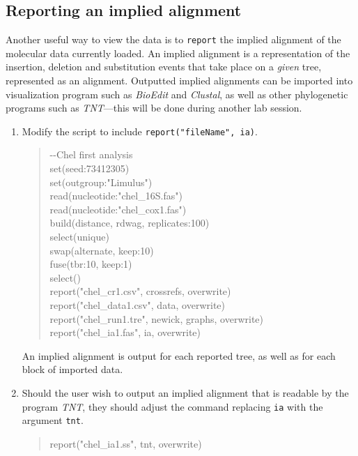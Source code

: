\documentclass[11pt]{article}
\begin{document}
\subsection{Reporting an implied alignment}
\label{subsec:ia}

Another useful way to view the data is to \texttt{report} the implied alignment of the 
molecular data currently loaded. An implied alignment is a representation of the 
insertion, deletion and substitution events that take place on a \emph{given} tree, 
represented as an alignment. Outputted implied alignments can be imported into 
visualization program such as \emph{BioEdit} and \emph{Clustal}, as well as other 
phylogenetic programs such as \emph{TNT}---this will be done during another lab 
session. 

\begin{enumerate}

\item Modify the script to include \texttt{report("fileName", ia)}.

	\begin{quote}
	-\/-Chel first analysis\\
	set(seed:73412305)\\
	set(outgroup:"Limulus")\\
	read(nucleotide:"chel\_16S.fas")\\
	read(nucleotide:"chel\_cox1.fas")\\
	build(distance, rdwag, replicates:100)\\
	select(unique)\\
	swap(alternate, keep:10)\\
	fuse(tbr:10, keep:1)\\
	select()\\
	report("chel\_cr1.csv", crossrefs, overwrite)\\
	report("chel\_data1.csv", data, overwrite)\\
	report("chel\_run1.tre", newick, graphs, overwrite)\\
	report("chel\_ia1.fas", ia, overwrite)\\
	\end{quote}
	
An implied alignment is output for each reported tree, as well as for each block of imported data.

\item Should the user wish to output an implied alignment that is readable by the 
program \emph{TNT}, they should adjust the command  replacing \texttt{ia} with the
argument \texttt{tnt}.

	\begin{quote}
	report("chel\_ia1.ss", tnt, overwrite)\\
	\end{quote}
	
\end{enumerate}
\end{document}
